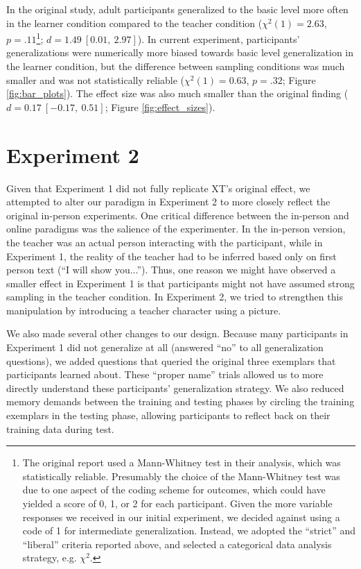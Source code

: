 \documentclass[man]{apa2}
\begin{document}
In the original study, adult participants generalized to the basic level more often in the learner condition compared to the teacher condition ($\chi^2(1) = 2.63$, $p = .11$\footnote{The original report used a Mann-Whitney test in their analysis, which was statistically reliable. Presumably the choice of the Mann-Whitney test was due to one aspect of the coding scheme for outcomes, which could have yielded a score of 0, 1, or 2 for each participant. Given the more variable responses we received in our initial experiment, we decided against using a code of 1 for intermediate generalization. Instead, we adopted the ``strict'' and ``liberal'' criteria reported above, and selected a categorical data analysis strategy, e.g. $\chi^2$.}; $d = 1.49\ [0.01,\ 2.97]$). In current experiment, participants' generalizations were numerically more biased towards basic level generalization in the learner condition, but the difference between sampling conditions was much smaller and was not statistically reliable ($\chi^2(1) = 0.63$, $p = .32$; Figure \ref{fig:bar_plots}). The effect size was also much smaller than the original finding ($d = 0.17\ [-0.17,\ 0.51]$; Figure \ref{fig:effect_sizes}).

\section{Experiment 2}

Given that Experiment 1 did not fully replicate XT's original effect, we attempted to alter our paradigm in Experiment 2 to more closely reflect the original in-person experiments. One critical difference between the in-person and online paradigms was the salience of the experimenter. In the in-person version, the teacher was an actual person interacting with the participant, while in Experiment 1, the reality of the teacher had to be inferred based only on first person text (``I will show you...''). Thus, one reason we might have observed a smaller effect in Experiment 1 is that participants might not have assumed strong sampling in the teacher condition. In Experiment 2, we tried to strengthen this manipulation by introducing a teacher character using a picture.

We also made several other changes to our design. Because many participants in Experiment 1 did not generalize at all (answered ``no'' to all generalization questions), we added questions that queried the original three exemplars that participants learned about. These ``proper name'' trials allowed us to more directly understand these participants' generalization strategy. We also reduced memory demands between the training and testing phases by circling the training exemplars in the testing phase, allowing participants to reflect back on their training data during test.
\end{document}
